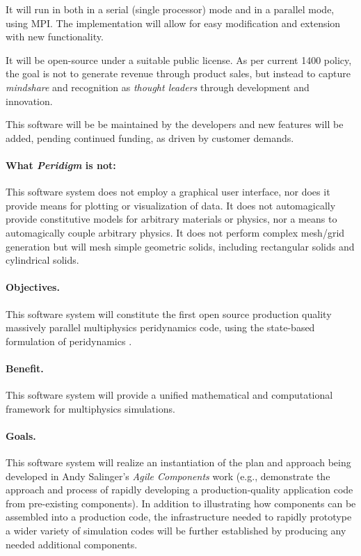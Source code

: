 \documentclass[10pt]{article}
\theoremstyle{plain}
\theoremstyle{definition}
\begin{document}
It will run in both in a serial (single processor) mode and in a parallel mode, using MPI. The implementation will allow for easy modification and extension with new functionality.

It will be open-source under a suitable public license. As per current 1400 policy, the goal is not to generate revenue through product sales, but instead to capture \emph{mindshare} and recognition as \emph{thought leaders} through development and innovation.

This software will be be maintained by the developers and new features will be added, pending continued funding, as driven by customer demands.

\paragraph{What \emph{Peridigm} is not:}

This software system does not employ a graphical user interface, nor does it provide means for plotting or visualization of data. It does not automagically provide constitutive models for arbitrary materials or physics, nor a means to automagically couple arbitrary physics. It does not perform complex mesh/grid generation but will mesh simple geometric solids, including rectangular solids and cylindrical solids.

\paragraph{Objectives.} This software system will constitute the first open source production quality massively parallel multiphysics peridynamics code, using the state-based formulation of peridynamics \cite{Silling:2007:PDStates}.

\paragraph{Benefit.} This software system will provide a unified mathematical and computational framework for multiphysics simulations.

\paragraph{Goals.} This software system will realize an instantiation of the plan and approach being developed in Andy Salinger's \emph{Agile Components} work (e.g., demonstrate the approach and process of rapidly developing a production-quality application code from pre-existing components). In addition to illustrating how components can be assembled into a production code, the infrastructure needed to rapidly prototype a wider variety of simulation codes will be further established by producing any needed additional components.
\end{document}
